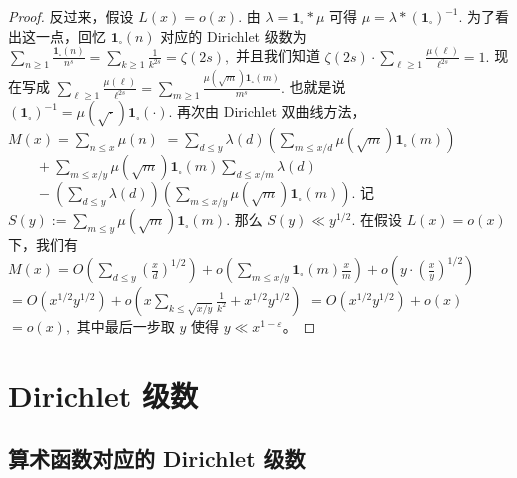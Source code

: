 \begin{proof}
	反过来，假设
	\(\textstyle L(x)=\allowbreak{}o(x).\)
	由
	\(\textstyle \lambda=\allowbreak{}\mathbf 1_{\square}*\mu\)
	可得
	\(\textstyle \mu=\allowbreak{}\lambda*(\mathbf 1_{\square})^{-1}.\)
	为了看出这一点，回忆 $\mathbf 1_{\square}(n)$ 对应的 Dirichlet 级数为
	\(\textstyle \sum_{n\geq\allowbreak{} 1}\frac{\mathbf 1_{\square}(n)}{n^s} =\allowbreak{} \sum_{k\geq\allowbreak{} 1}\frac1{k^{2s}} =\allowbreak{} \zeta(2s),\allowbreak{}\)
	并且我们知道
	\(\textstyle \zeta(2s)\cdot\sum_{\ell\geq\allowbreak{} 1}\frac{\mu(\ell)}{\ell^{2s}}=\allowbreak{}1.\)
	现在写成
	\(\textstyle \sum_{\ell\geq\allowbreak{} 1}\frac{\mu(\ell)}{\ell^{2s}} =\allowbreak{} \sum_{m\geq\allowbreak{} 1} \frac{\mu(\sqrt m)\mathbf 1_{\square}(m)}{m^s}.\)
	也就是说
	\(\textstyle (\mathbf 1_{\square})^{-1} =\allowbreak{} \mu(\sqrt{\cdot})\mathbf 1_{\square}(\cdot).\)
	再次由 Dirichlet 双曲线方法，
	\(\textstyle M(x) =\allowbreak{}\sum_{n\leq\allowbreak{} x}\mu(n)\) \(\textstyle =\allowbreak{} \sum_{d\leq\allowbreak{} y}\lambda(d) \left(\sum_{m\leq\allowbreak{} x/d}\mu(\sqrt m)\mathbf 1_{\square}(m)\right)\) \(\textstyle \qquad+\allowbreak{} \sum_{m\leq\allowbreak{} x/y}\mu(\sqrt m)\mathbf 1_{\square}(m) \sum_{d\leq\allowbreak{} x/m}\lambda(d)\) \(\textstyle \qquad- \left(\sum_{d\leq\allowbreak{} y}\lambda(d)\right) \left(\sum_{m\leq\allowbreak{} x/y}\mu(\sqrt m)\mathbf 1_{\square}(m)\right).\)
	记
	\(\textstyle S(y):=\allowbreak{}\sum_{m\leq\allowbreak{} y}\mu(\sqrt m)\mathbf 1_{\square}(m).\)
	那么
	\(\textstyle S(y)\ll\allowbreak{} y^{1/2}.\)
	在假设 $L(x)=o(x)$ 下，我们有
	\(\textstyle M(x) =\allowbreak{} O\left(\sum_{d\leq\allowbreak{} y}\left(\frac{x}{d}\right)^{1/2}\right) +\allowbreak{} o\left(\sum_{m\leq\allowbreak{} x/y}\mathbf 1_{\square}(m)\frac{x}{m}\right) +\allowbreak{} o\left(y\cdot\left(\frac{x}{y}\right)^{1/2}\right)\) \(\textstyle =\allowbreak{} O(x^{1/2}y^{1/2}) +\allowbreak{} o\left(x\sum_{k\leq\allowbreak{} \sqrt{x/y}}\frac1{k^2} +\allowbreak{} x^{1/2}y^{1/2}\right)\) \(\textstyle =\allowbreak{} O(x^{1/2}y^{1/2})+\allowbreak{}o(x)\) \(\textstyle =\allowbreak{}o(x),\allowbreak{}\)
	其中最后一步取 $y$ 使得 $y\ll x^{1-\varepsilon}$。
\end{proof}

\chapter{Dirichlet 级数}
\label{chap:dirichlet-series}


\section{算术函数对应的 Dirichlet 级数}

